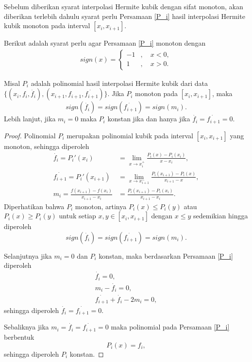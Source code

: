 Sebelum diberikan syarat interpolasi Hermite kubik dengan sifat monoton, akan diberikan terlebih dahulu syarat perlu Persamaan \eqref{P_i} hasil interpolasi Hermite kubik monoton pada interval $[x_i,x_{i+1}]$.

Berikut adalah syarat perlu agar Persamaan \eqref{P_i} monoton dengan
\begin{align*}
    sign(x) = \begin{cases}
        -1&, \quad x < 0, \\
        1&, \quad x > 0.
    \end{cases}
\end{align*}

\begin{teorema}\label{perluMonoton}
    Misal $P_i$ adalah polinomial hasil interpolasi Hermite kubik dari data $\{(x_i,f_i,\dot{f_i}),(x_{i+1},f_{i+1},\dot{f_{i+1}})\}$. Jika $P_i$ monoton pada $[x_i,x_{i+1}]$, maka 
    \begin{equation}
 sign(\dot{f_i})=sign(\dot{f_{i+1}})=sign(m_i).
    \end{equation}
    Lebih lanjut, jika $m_i=0$ maka $P_i$ konstan jika dan hanya jika $\dot{f_i}=\dot{f_{i+1}}=0$.
\end{teorema}
\begin{proof}
    Polinomial $P_i$ merupakan polinomial kubik pada interval $[x_i, x_{i+1}]$ yang monoton, sehingga diperoleh
    \begin{align*}
        \dot{f_i} = P_i'(x_i) &= \lim_{x \to x_i^+} \frac{P_i(x)-P_i(x_i)}{x-x_i}, \\
        \dot{f_{i+1}} = P_i'(x_{i+1}) &= \lim_{x \to x_{i+1}^-} \frac{P_i(x_{i+1})-P_i(x)}{x_{i+1}-x}, \\
        m_i = \frac{f(x_{i+1}) - f(x_i)}{x_{i+1}-x_i} &= \frac{P_i(x_{i+1}) - P_i(x_i)}{x_{i+1}-x_i}.
    \end{align*}
    Diperhatikan bahwa $P_i$ monoton, artinya $P_i(x) \leq P_i(y)$ atau $P_i(x) \geq P_i(y)$ untuk setiap $x,y \in [x_i,x_{i+1}]$ dengan $x \leq y$ sedemikian hingga diperoleh
    $$sign(\dot{f_i})=sign(\dot{f_{i+1}})=sign(m_i).$$

    Selanjutnya jika $m_i=0$ dan $P_i$ konstan, maka berdasarkan Persamaan \eqref{P_i} diperoleh
    \begin{align*}
        \dot{f_i} = 0, \\
        m_i-\dot{f_i} = 0, \\
        \dot{f_{i+1}}+\dot{f_i}-2m_i = 0,
    \end{align*}
    sehingga diperoleh $\dot{f_i}=\dot{f_{i+1}}=0$.

    Sebaliknya jika $m_i=\dot{f_i}=\dot{f_{i+1}}=0$ maka polinomial pada Persamaan \eqref{P_i} berbentuk
    \begin{equation*}
        P_i(x)=f_i,
    \end{equation*}
    sehingga diperoleh $P_i$ konstan.
\end{proof}

